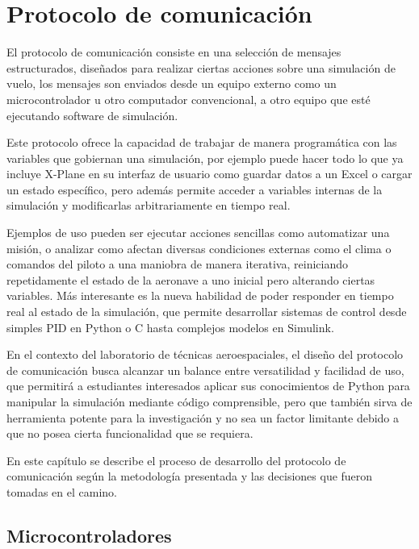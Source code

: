 \chapter{Protocolo de comunicación}

El protocolo de comunicación consiste en una selección de mensajes estructurados, diseñados para realizar ciertas acciones sobre una simulación de vuelo, los mensajes son enviados desde un equipo externo como un microcontrolador u otro computador convencional, a otro equipo que esté ejecutando software de simulación.

Este protocolo ofrece la capacidad de trabajar de manera programática con las variables que gobiernan una simulación, por ejemplo puede hacer todo lo que ya incluye X-Plane en su interfaz de usuario como guardar datos a un Excel o cargar un estado específico, pero además permite acceder a variables internas de la simulación y modificarlas arbitrariamente en tiempo real.

Ejemplos de uso pueden ser ejecutar acciones sencillas como automatizar una misión, o analizar como afectan diversas condiciones externas como el clima o comandos del piloto a una maniobra de manera iterativa, reiniciando repetidamente el estado de la aeronave a uno inicial pero alterando ciertas variables. Más interesante es la nueva habilidad de poder responder en tiempo real al estado de la simulación, que permite desarrollar sistemas de control desde simples PID en Python o C hasta complejos modelos en Simulink.

En el contexto del laboratorio de técnicas aeroespaciales, el diseño del protocolo de comunicación busca alcanzar un balance entre versatilidad y facilidad de uso, que permitirá a estudiantes interesados aplicar sus conocimientos de Python para manipular la simulación mediante código comprensible, pero que también sirva de herramienta potente para la investigación y no sea un factor limitante debido a que no posea cierta funcionalidad que se requiera.

En este capítulo se describe el proceso de desarrollo del protocolo de comunicación según la metodología presentada y las decisiones que fueron tomadas en el camino.

\section{Microcontroladores}


